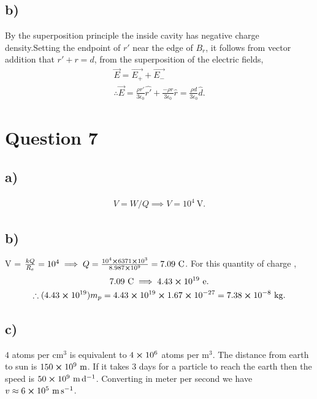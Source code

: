\documentclass[
	12pt,
	]{article}
\newcommand{\ep}{\epsilon}
\theoremstyle{definition}
\theoremstyle{definition}
\theoremstyle{definition}
\theoremstyle{definition}
\theoremstyle{definition}
\theoremstyle{example}
\theoremstyle{note}
\theoremstyle{remark}
\theoremstyle{example}
\begin{document}
				\subsection*{b) }
					By the superposition principle the inside cavity has negative charge density.Setting the endpoint of $r'$ near the edge of $B_{r}$, it follows from vector addition that $r' + r = d$, from the superposition of the electric fields, 
					\begin{gather*}
						\vec{E} = \vec{E_{+}} + \vec{E_{-}} \\
						\therefore \vec{E} = \frac{\rho r'}{3 \ep_{0}} \hat{r'} + \frac{-\rho r}{3 \ep_{0}} \hat{r} = \frac{\rho d}{3 \ep_{0}}\hat{d} .
					\end{gather*}
			\section*{Question 7}
				\subsection*{a) }
					\begin{gather*}
						V = W/Q \implies V = 10^{4} \ \si{\volt}.
					\end{gather*}
				\subsection*{b) }
					V = $\frac{kQ}{R_{e}} = 10^{4} \implies Q = \frac{10^{4} \cross 6371 \cross 10^{3}}{8.987\cross 10^{9}} = 7.09 \ \si{\coulomb}$.
					For this quantity of charge ,
					\begin{gather*}
						7.09 \ \si{\coulomb} \implies 4.43 \cross 10^{19} \ \text{e}. \\
						\therefore (4.43 \cross 10^{19})m_{p} = 4.43 \cross 10^{19} \cross 1.67 \cross 10^{-27} = 7.38 \cross 10^{-8} \ \si{\kilogram}.
					\end{gather*}
				\subsection*{c) }
					$4$ atoms per $\si{\centi\meter\cubed}$ is equivalent to $4\cross 10^{6}$ atoms per $\si{\meter\cubed}$. The distance from earth to sun is $150 \cross 10^{9} \ \si{\meter}$. If it takes $3$ days for a particle to reach the earth then the speed is $50 \cross 10^{9} \ \si{\meter\per\day}$. Converting in meter per second we have $v \approx 6 \cross 10^{5} \ \si{\meter\per\second}$.
					
\end{document}
